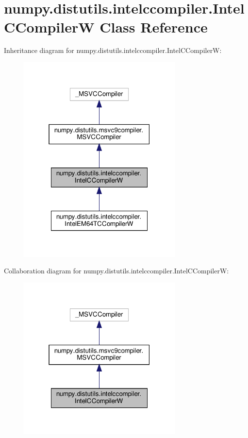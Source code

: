 \hypertarget{classnumpy_1_1distutils_1_1intelccompiler_1_1IntelCCompilerW}{}\section{numpy.\+distutils.\+intelccompiler.\+Intel\+C\+CompilerW Class Reference}
\label{classnumpy_1_1distutils_1_1intelccompiler_1_1IntelCCompilerW}


Inheritance diagram for numpy.\+distutils.\+intelccompiler.\+Intel\+C\+CompilerW\+:
\nopagebreak
\begin{figure}[H]
\begin{center}
\leavevmode
\includegraphics[width=235pt]{classnumpy_1_1distutils_1_1intelccompiler_1_1IntelCCompilerW__inherit__graph}
\end{center}
\end{figure}


Collaboration diagram for numpy.\+distutils.\+intelccompiler.\+Intel\+C\+CompilerW\+:
\nopagebreak
\begin{figure}[H]
\begin{center}
\leavevmode
\includegraphics[width=235pt]{classnumpy_1_1distutils_1_1intelccompiler_1_1IntelCCompilerW__coll__graph}
\end{center}
\end{figure}
